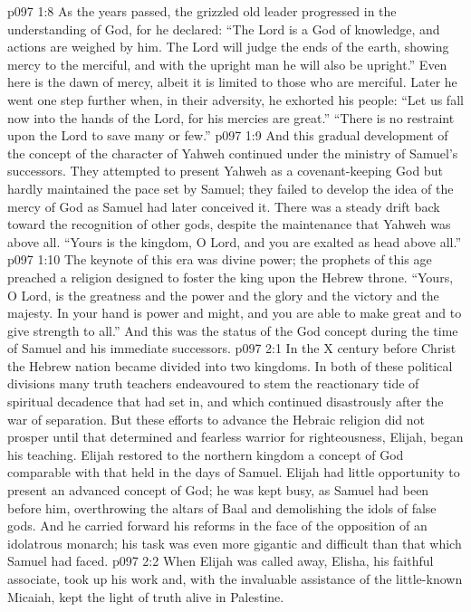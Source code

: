 \vs p097 1:8 As the years passed, the grizzled old leader progressed in the understanding of God, for he declared: “The Lord is a God of knowledge, and actions are weighed by him. The Lord will judge the ends of the earth, showing mercy to the merciful, and with the upright man he will also be upright.” Even here is the dawn of mercy, albeit it is limited to those who are merciful. Later he went one step further when, in their adversity, he exhorted his people: “Let us fall now into the hands of the Lord, for his mercies are great.” “There is no restraint upon the Lord to save many or few.”
\vs p097 1:9 \pc And this gradual development of the concept of the character of Yahweh continued under the ministry of Samuel’s successors. They attempted to present Yahweh as a covenant\hyp{}keeping God but hardly maintained the pace set by Samuel; they failed to develop the idea of the mercy of God as Samuel had later conceived it. There was a steady drift back toward the recognition of other gods, despite the maintenance that Yahweh was above all. “Yours is the kingdom, O Lord, and you are exalted as head above all.”
\vs p097 1:10 The keynote of this era was divine power; the prophets of this age preached a religion designed to foster the king upon the Hebrew throne. “Yours, O Lord, is the greatness and the power and the glory and the victory and the majesty. In your hand is power and might, and you are able to make great and to give strength to all.” And this was the status of the God concept during the time of Samuel and his immediate successors.
\vs p097 2:1 In the X century before Christ the Hebrew nation became divided into two kingdoms. In both of these political divisions many truth teachers endeavoured to stem the reactionary tide of spiritual decadence that had set in, and which continued disastrously after the war of separation. But these efforts to advance the Hebraic religion did not prosper until that determined and fearless warrior for righteousness, Elijah, began his teaching. Elijah restored to the northern kingdom a concept of God comparable with that held in the days of Samuel. Elijah had little opportunity to present an advanced concept of God; he was kept busy, as Samuel had been before him, overthrowing the altars of Baal and demolishing the idols of false gods. And he carried forward his reforms in the face of the opposition of an idolatrous monarch; his task was even more gigantic and difficult than that which Samuel had faced.
\vs p097 2:2 When Elijah was called away, Elisha, his faithful associate, took up his work and, with the invaluable assistance of the little\hyp{}known Micaiah, kept the light of truth alive in Palestine.
